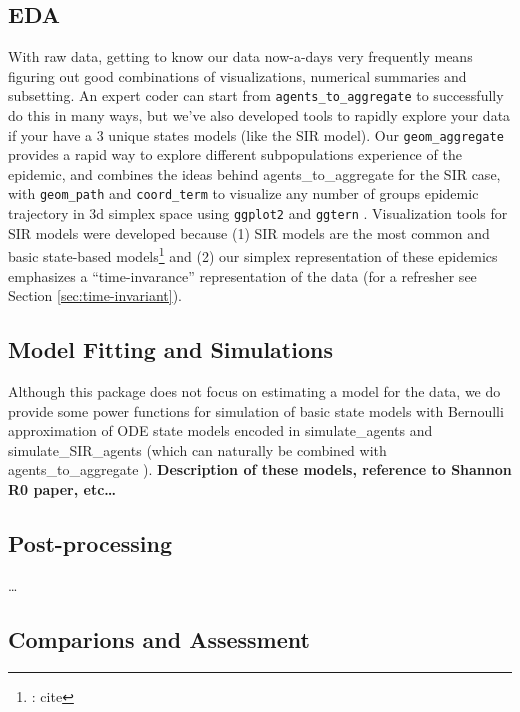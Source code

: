 \documentclass[
  shortnames]{jss}
\begin{document}
\hypertarget{eda}{%
\subsection{EDA}\label{eda}}

With raw data, getting to know our data now-a-days very frequently means
figuring out good combinations of visualizations, numerical summaries
and subsetting. An expert coder can start from
\texttt{agents\_to\_aggregate} to successfully do this in many ways, but
we've also developed tools to rapidly explore your data if your have a 3
unique states models (like the SIR model). Our \texttt{geom\_aggregate}
provides a rapid way to explore different subpopulations experience of
the epidemic, and combines the ideas behind agents\_to\_aggregate for
the SIR case, with \texttt{geom\_path} and \texttt{coord\_term} to
visualize any number of groups epidemic trajectory in 3d simplex space
using \texttt{ggplot2} and \texttt{ggtern}
\citep{Wickham2016, Hamilton2018}. Visualization tools for SIR models
were developed because (1) SIR models are the most common and basic
state-based models\footnote{\@Shannon: cite} and (2) our simplex
representation of these epidemics emphasizes a ``time-invarance''
representation of the data (for a refresher see Section
\ref{sec:time-invariant}).

\hypertarget{model-fitting-and-simulations}{%
\subsection{Model Fitting and
Simulations}\label{model-fitting-and-simulations}}

Although this package does not focus on estimating a model for the data,
we do provide some power functions for simulation of basic state models
with Bernoulli approximation of ODE state models encoded in
simulate\_agents and simulate\_SIR\_agents (which can naturally be
combined with agents\_to\_aggregate ). \textbf{Description of these
models, reference to Shannon R0 paper, etc\ldots{}}

\hypertarget{post-processing}{%
\subsection{Post-processing}\label{post-processing}}

\ldots{}

\hypertarget{comparions-and-assessment}{%
\subsection{Comparions and Assessment}\label{comparions-and-assessment}}
\end{document}
